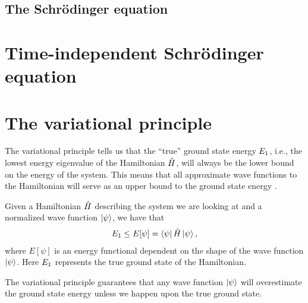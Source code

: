         \subsection{The Schrödinger equation}

    \section{Time-independent Schrödinger equation}
    \section{The variational principle}
        The variational principle tells us that the ``true'' ground state energy
        $E_1$, i.e., the lowest energy eigenvalue of the Hamiltonian
        $\hat{H}$, will always be the lower bound on the energy of the system.
        This means that all approximate wave functions to the Hamiltonian will
        serve as an upper bound to the ground state energy
        \cite{griffiths2017introduction}.
        \begin{theorem}
            Given a Hamiltonian $\hat{H}$ describing the system we are looking
            at and a normalized wave function $\ket{\psi}$, we have that
            \begin{align}
                E_1
                \leq
                E[\psi]
                = \bra{\psi}\hat{H}\ket{\psi},
                \label{eq:variational-principle}
            \end{align}
            where $E[\psi]$ is an energy functional dependent on the shape of
            the wave function $\ket{\psi}$.
            Here $E_1$ represents the true ground state of the
            Hamiltonian.
        \end{theorem}
        The variational principle guarantees that any wave function $\ket{\psi}$
        will overestimate the ground state energy unless we happen upon the true
        ground state.
